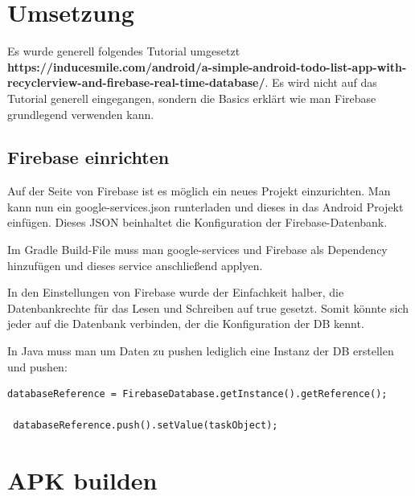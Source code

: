 \section{Umsetzung}
Es wurde generell folgendes Tutorial umgesetzt \textbf{https://inducesmile.com/android/a-simple-android-todo-list-app-with-recyclerview-and-firebase-real-time-database/}. Es wird nicht auf das Tutorial generell eingegangen, sondern die Basics erklärt wie man Firebase grundlegend verwenden kann.

\subsection{Firebase einrichten}
Auf der Seite von Firebase ist es möglich ein neues Projekt einzurichten. Man kann nun ein google-services.json runterladen und dieses in das Android Projekt einfügen. Dieses JSON beinhaltet die Konfiguration der Firebase-Datenbank.

Im Gradle Build-File muss man google-services und Firebase als Dependency hinzufügen und dieses service anschließend applyen.

In den Einstellungen von Firebase wurde der Einfachkeit halber, die Datenbankrechte für das Lesen und Schreiben auf true gesetzt. Somit könnte sich jeder auf die Datenbank verbinden, der die Konfiguration der DB kennt.

In Java muss man um Daten zu pushen lediglich eine Instanz der DB erstellen und pushen:
\begin{lstlisting}
databaseReference = FirebaseDatabase.getInstance().getReference();

 databaseReference.push().setValue(taskObject);
\end{lstlisting}
\section{APK builden}